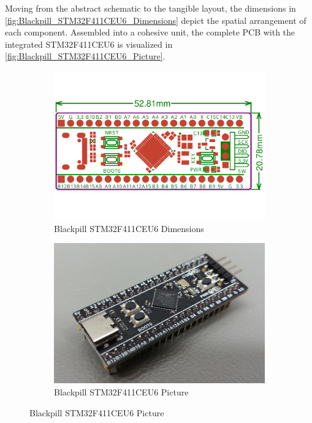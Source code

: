 Moving from the abstract schematic to the tangible layout, the dimensions in \autoref{fig:Blackpill_STM32F411CEU6_Dimensions} depict the spatial arrangement of each component. Assembled into a cohesive unit, the complete PCB with the integrated STM32F411CEU6 is visualized in \autoref{fig:Blackpill_STM32F411CEU6_Picture}.
\begin{figure}[H]
    \centering
    \begin{subfigure}{0.48\textwidth}
        \includegraphics[width=\linewidth]{img/blackpill/original-dimensions-STM32F411CEU6_WeAct_Black_Pill_V2.0.pdf}
        \caption{Blackpill STM32F411CEU6 Dimensions}
        \label{fig:Blackpill_STM32F411CEU6_Dimensions}
    \end{subfigure}
    \hfill
    \begin{subfigure}{0.48\textwidth}
        \includegraphics[width=\linewidth]{img/blackpill/STM32F411CEU6_WeAct_Black_Pill_V2.0-1.jpg}
    \caption{Blackpill STM32F411CEU6 Picture}
    \label{fig:Blackpill_STM32F411CEU6_Picture}
    \end{subfigure}
\end{figure}

